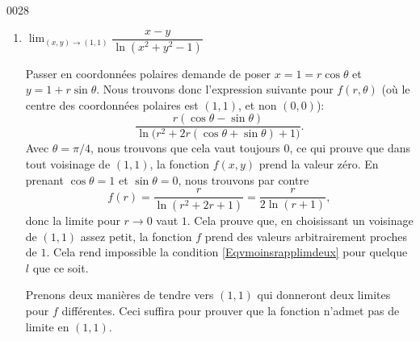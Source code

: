 \begin{corrige}{0028}
\begin{enumerate}
\begin{alternative}
			      \[\begin{array}{cccc}

					      x= 0, \; y\rightarrow  0^+ & \lim_{(x,y)\rightarrow (0,0)} \dfrac{x-y}{\ln(x^2+y^2+1)}  & =   & -\lim_{y\rightarrow 0^+}\dfrac{y}{\ln(1+y^2)} \\
					                                 &                                                            & =^H & -\lim\dfrac{1+y^2}{2y} \;= \; -\infty         \\

					      x\rightarrow 0^+, \; y=0   & \lim_{(x,y)\rightarrow (0,0)} \dfrac{x-y}{\ln(x^2+y^2+1) } & =   & \lim_{x\rightarrow 0^+}\dfrac{x}{\ln(1+x^2)}  \\
					                                 &                                                            & =^H & \lim\dfrac{1+x^2}{2x} \;= \; +\infty
				      \end{array}\]

		      \end{alternative}


		\item   $\lim_{(x,y)\rightarrow (1,1)} \dfrac{x-y}{\ln(x^2+y^2-1)}$

		      Passer en coordonnées polaires demande de poser $x=1=r\cos\theta$ et $y=1+r\sin\theta$. Nous trouvons donc l'expression suivante pour $f(r,\theta)$ (où le centre des coordonnées polaires est $(1,1)$, et non $(0,0)$):
		      \begin{equation}
			      \frac{ r(\cos\theta-\sin\theta) }{ \ln\big( r^2+2r(\cos\theta+\sin\theta)+1 \big) }.
		      \end{equation}
		      Avec $\theta=\pi/4$, nous trouvons que cela vaut toujours $0$, ce qui prouve que dans tout voisinage de $(1,1)$, la fonction $f(x,y)$ prend la valeur zéro. En prenant $\cos\theta=1$ et $\sin\theta=0$, nous trouvons par contre
		      \begin{equation}
			      f(r)=\frac{ r }{ \ln(r^2+2r+1) }=\frac{ r }{ 2\ln(r+1) },
		      \end{equation}
		      donc la limite pour $r\to 0$ vaut $1$. Cela prouve que, en choisissant un voisinage de $(1,1)$ assez petit, la fonction $f$ prend des valeurs arbitrairement proches de $1$. Cela rend impossible la condition \eqref{Eqvmoinsrapplimdeux} pour quelque $l$ que ce soit.

		      \begin{alternative}
			      Prenons deux manières de tendre vers $(1,1)$ qui donneront deux limites pour $f$ différentes. Ceci suffira pour prouver que la fonction n'admet pas de limite en $(1,1)$.


\end{alternative}
\end{enumerate}
\end{corrige}
